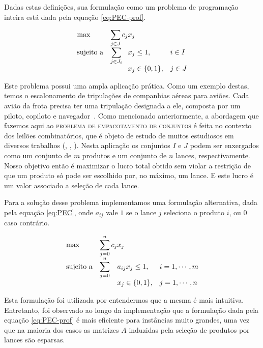 \documentclass{article}
\begin{document}
	
	Dadas estas definições, sua formulação como um problema de programação inteira está dada pela equação \ref{eq:PEC-prof}.
	
	\begin{equation}
		\label{eq:PEC-prof}
        \begin{array}{ll@{}ll}
            \text{max}  & \displaystyle\sum\limits_{j \in J} c_{j}&x_{j} &\\
            \text{sujeito a}& \displaystyle\sum\limits_{j \in J_i}   &x_{j} \leq 1,  &i \in I\\
                 &                                                &x_{j} \in \{0,1\}, &j \in J
        \end{array}
    \end{equation}
    
	Este problema possui uma ampla aplicação prática. Como um exemplo destas, temos o escalonamento de tripulações de companhias aéreas para aviões. Cada avião da frota precisa ter uma tripulação designada a ele, composta por um piloto, copiloto e navegador~\cite{Airline}.    
    Como mencionado anteriormente, a abordagem que fazemos aqui ao \textsc{problema de empacotamento de conjuntos} é feita no contexto dos leilões combinatórios, que é objeto de estudo de muitos estudiosos em diversos trabalhos (\cite{Winner}, \cite{Taming}, \cite{CABOB}). Nesta aplicação os conjuntos $I$ e $J$ podem ser enxergados como um conjunto de $m$ produtos e um conjunto de $n$ lances, respectivamente. Nosso objetivo então é maximizar o lucro total obtido sem violar a restrição de que um produto só pode ser escolhido por, no máximo, um lance. E este lucro é um valor associado a seleção de cada {\color{red} lance}. 
    
    {\color{red}
    Para a solução desse problema implementamos uma formulação alternativa, dada pela equação \ref{eq:PEC}, onde $ a_{ij} $ vale $ 1 $ se o lance $ j $ seleciona o produto $ i $, ou $ 0 $ caso contrário.
    
    \begin{equation}
    	\label{eq:PEC}
    	\begin{array}{ll@{}ll}
    		\text{max}  & \displaystyle\sum\limits_{j = 0}^{n} c_{j} & x_{j} &\\
    		\text{sujeito a}& \displaystyle\sum\limits_{j = 0}^{n}   & a_{ij}x_{j} \leq 1,  & i=1,\cdots,m\\
    		&                                                &x_{j} \in \{0,1\}, & j = 1,\cdots,n
    	\end{array}
    \end{equation}
    
    Esta formulação foi utilizada por entendermos que a mesma é mais intuitiva. Entretanto, foi observado ao longo da implementação que a formulação dada pela equação \ref{eq:PEC-prof} é mais eficiente para instâncias muito grandes, uma vez que na maioria dos casos as matrizes $ A $ induzidas pela seleção de produtos por lances são esparsas. 
	}
	
\end{document}
